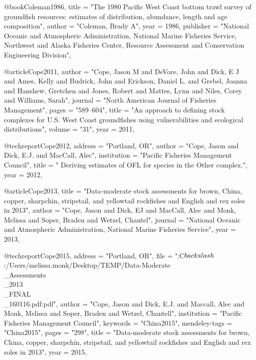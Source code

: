 @book{Coleman1986,
    title = "{The 1980 Pacific West Coast bottom trawl survey of groundfish resources: estimates of distribution, abundance, length and age composition}",
    author = "{Coleman, Brady A}",
    year = 1986,
    publisher = "{National Oceanic and Atmospheric Administration, National Marine Fisheries Service, Northwest and Alaska Fisheries Center, Resource Assessment and Conservation Engineering Division}",
}

@article{Cope2011,
    author = "{Cope, Jason M and DeVore, John and Dick, E J and Ames, Kelly and Budrick, John and Erickson, Daniel L. and Grebel, Joanna and Hanshew, Gretchen and Jones, Robert and Mattes, Lynn and Niles, Corey and Williams, Sarah}",
    journal = "{North American Journal of Fisheries Management}",
    pages = "{589--604}",
    title = "{{An approach to defining stock complexes for U.S. West Coast groundfishes using vulnerabilities and ecological distributions}}",
    volume = "{31}",
    year = 2011,
}

@techreport{Cope2012,
    address = "{Portland, OR}",
    author = "{Cope, Jason and Dick, E.J. and MacCall, Alec}",
    institution = "{Pacific Fisheries Management Council}",
    title = "{{ Deriving estimates of OFL for species in the Other\nFish complex.}}",
    year = 2012,
}

@article{Cope2013,
    title = "{Data-moderate stock assessments for brown, China, copper, sharpchin, stripetail, and yellowtail rockfishes and English and rex soles in 2013}",
    author = "{Cope, Jason and Dick, EJ and MacCall, Alec and Monk, Melissa and Soper, Braden and Wetzel, Chantel}",
    journal = "{National Oceanic and Atmospheric Administration, National Marine Fisheries Service}",
    year = 2013,
}

@techreport{Cope2015,
    address = "{Portland, OR}",
    file = "{:C$\\backslash$:/Users/melissa.monk/Desktop/TEMP/Data-Moderate\\_Assessments\\_2013\\_FINAL\\_160116.pdf:pdf}",
    author = "{Cope, Jason and Dick, E.J. and Maccall, Alec and Monk, Melissa and Soper, Braden and Wetzel, Chantell}",
    institution = "{Pacific Fisheries Management Council}",
    keywords = "{China2015}",
    mendeley-tags = "{China2015}",
    pages = "{298}",
    title = "{{Data-moderate stock assessments for brown, China, copper, sharpchin, stripetail, and yellowtail rockfishes and English and rex soles in 2013}}",
    year = 2015,
}

